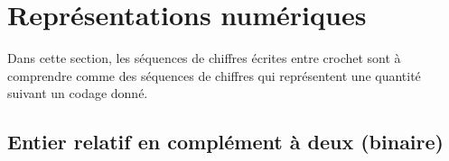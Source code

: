 \section{Représentations numériques}

Dans cette section, les séquences de chiffres écrites entre crochet sont à comprendre comme des séquences de chiffres qui représentent une quantité suivant un codage donné.

\subsection{Entier relatif en complément à deux (binaire)}

